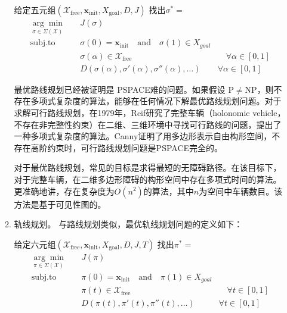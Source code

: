 \begin{enumerate}[wide=\parindent]
\begin{enumerate}[label=(\arabic*),wide=\parindent]
\begin{definition}[最优路线规划]
\label{def:path}
给定五元组$(\mathcal{X}_{\mathrm{free}}, \mathbf{x}_{\mathrm{init}}, X_{\mathrm{goal}}, D, J)$ 找出$\sigma^*=$
\begin{equation}
\begin{aligned}
\underset{\sigma\in \Sigma(\mathcal{X})}{\arg\min}\quad & J(\sigma) & \\
\mathrm{subj. to} \quad & \sigma(0)=\mathbf{x}_{\mathrm{init}} \quad \mathrm{and} \quad \sigma(1)\in X_{goal} & \\
\quad & \sigma(\alpha)\in \mathcal{X}_{\mathrm{free}} & \quad \forall \alpha\in [0,1]\\
& D(\sigma(\alpha),\sigma'(\alpha),\sigma''(\alpha), \dots) & \forall \alpha\in [0,1]
\end{aligned}
\end{equation}
\end{definition}

最优路线规划已经被证明是 PSPACE难的问题\cite{Reif1979Complexity}。如果假设 $\mathrm{P}\neq \mathrm{NP}$，则不存在多项式复杂度的算法，能够在任何情况下解最优路线规划问题。对于求解可行路线规划，在1979年，Reif\cite{Reif1979Complexity}研究了完整车辆（holonomic vehicle，不存在非完整性约束）在二维、三维环境中寻找可行路线的问题，提出了一种多项式复杂度的算法。Canny\cite{Canny1988The}证明了用多边形表示自由构形空间，不存在高阶约束时，可行路线规划问题是PSPACE完全的。

对于最优路线规划，常见的目标是求得最短的无障碍路径。在该目标下，对于完整车辆，在二维多边形障碍的构形空间中存在多项式时间的算法\cite{Storer1994Shortest,Lozano1979An}。更准确地讲，存在复杂度为$O(n^2)$的算法，其中$n$为空间中车辆数目。该方法是基于可见性图的。

\item 轨线规划。 与路线规划类似，最优轨线规划问题的定义如下：

\begin{definition}[最优轨线规划]
\label{def:trajectory}
给定六元组$(\mathcal{X}_{\mathrm{free}}, \mathbf{x}_{\mathrm{init}}, X_{\mathrm{goal}}, D, J, T)$ 找出$\pi^*=$
\begin{equation}
\begin{aligned}
\underset{\pi\in \Sigma(\mathcal{X})}{\arg\min}\quad & J(\pi) & \\
\mathrm{subj. to} \quad & \pi(0)=\mathbf{x}_{\mathrm{init}} \quad \mathrm{and} \quad \pi(1)\in X_{goal} & \\
\quad & \pi(t)\in \mathcal{X}_{\mathrm{free}} & \quad \forall t\in [0,1]\\
& D(\pi(t),\pi'(t),\pi''(t), \dots) & \forall t\in [0,1]
\end{aligned}
\end{equation}
\end{definition}
\end{enumerate}


\end{enumerate}
